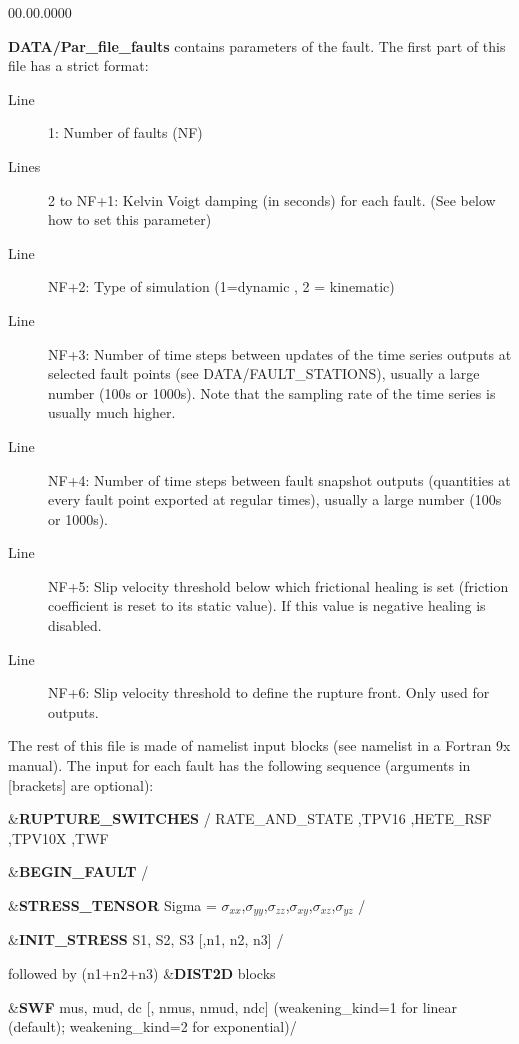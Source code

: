 \begin{lyxlist}{00.00.0000}
\item [{\textbf{DATA/Par\_file\_faults}}] contains parameters of the fault.
The first part of this file has a strict format:

\begin{description}
\item [{Line}] 1: Number of faults (NF)
\item [{Lines}] 2 to NF+1: Kelvin Voigt damping (in seconds) for each fault.
(See below how to set this parameter)
\item [{Line}] NF+2: Type of simulation (1=dynamic , 2 = kinematic)
\item [{Line}] NF+3: Number of time steps between updates of the time series
outputs at selected fault points (see DATA/FAULT\_STATIONS), usually
a large number (100s or 1000s). Note that the sampling rate of the
time series is usually much higher.
\item [{Line}] NF+4: Number of time steps between fault snapshot outputs
(quantities at every fault point exported at regular times), usually
a large number (100s or 1000s).
\item [{Line}] NF+5: Slip velocity threshold below which frictional healing
is set (friction coefficient is reset to its static value). If this
value is negative healing is disabled.
\item [{Line}] NF+6: Slip velocity threshold to define the rupture front.
Only used for outputs.
\end{description}

The rest of this file is made of namelist input blocks (see \textquotedbl{}namelist\textquotedbl{}
in a Fortran 9x manual). The input for each fault has the following
sequence (arguments in {[}brackets{]} are optional):

\&\textbf{RUPTURE\_SWITCHES}  /
RATE\_AND\_STATE ,TPV16 ,HETE\_RSF ,TPV10X ,TWF

\&\textbf{BEGIN\_FAULT} /

\&\textbf{STRESS\_TENSOR} Sigma = $\sigma_{xx}$,$\sigma_{yy}$,$\sigma_{zz}$,$\sigma_{xy}$,$\sigma_{xz}$,$\sigma_{yz}$ /



\&\textbf{INIT\_STRESS} S1, S2, S3 {[},n1, n2, n3{]} /


followed by (n1+n2+n3) \&\textbf{DIST2D} blocks


\&\textbf{SWF} mus, mud, dc {[}, nmus, nmud, ndc{]} (weakening\_kind=1 for linear (default); weakening\_kind=2 for exponential)/


\end{lyxlist}
